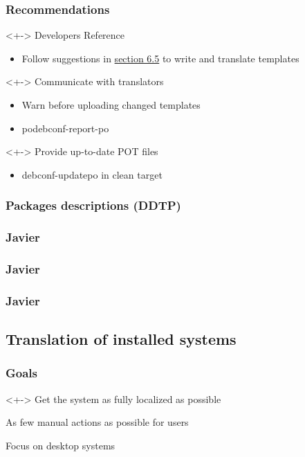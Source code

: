 \documentclass{beamer}
\begin{document}
\begin{frame}
  \frametitle{Recommendations}
	\begin{block}<+->
		{Developers Reference}
		\begin{itemize}
		\item
			Follow suggestions in \href{http://www.debian.org/doc/developers-reference/ch-best-pkging-practices.html#s-bpp-config-mgmt}{section 6.5} to write and translate templates
		\end{itemize}
	\end{block}
	\begin{block}<+->
		{Communicate with translators}
		\begin{itemize}
		\item
			Warn before uploading changed templates
		\item
			podebconf-report-po
		\end{itemize}
	\end{block}
	\begin{block}<+->
		{Provide up-to-date POT files}
		\begin{itemize}
		\item
			debconf-updatepo in clean target
		\end{itemize}
	\end{block}
\end{frame}

\subsubsection{Packages descriptions (DDTP)}

\begin{frame}
  \frametitle{Javier}
\end{frame}

\begin{frame}
  \frametitle{Javier}
\end{frame}

\begin{frame}
  \frametitle{Javier}
\end{frame}

\subsection{Translation of installed systems}

\begin{frame}
  \frametitle{Goals}
	\begin{block}<+->
		{Get the system as fully localized as possible}
	\end{block}
	\begin{block}
		{As few manual actions as possible for users}
	\end{block}
	\begin{block}
		{Focus on desktop systems}
	\end{block}
\end{frame}
\end{document}
